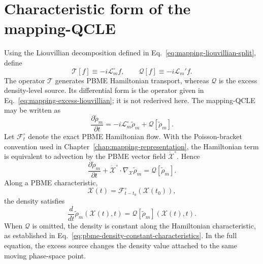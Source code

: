 \documentclass[
  11pt,
  letterpaper,
  onehalfspacing,
  normalmargins,
  equalmargins,
  oneside
]{ut-thesis}
\begin{document}
\section{Characteristic form of the mapping-QCLE}
\label{sec:ch5-characteristic-form}

Using the Liouvillian decomposition defined in
Eq.~\eqref{eq:mapping-liouvillian-split}, define
\begin{equation}
\mathcal T[f]
\equiv
-i\mathcal L_m^{\circ}f,
\qquad
\mathcal Q[f]
\equiv
-i\mathcal L_m'f.
\label{eq:ch5-transport-source-operators}
\end{equation}
The operator \(\mathcal T\) generates PBME Hamiltonian transport, whereas
\(\mathcal Q\) is the excess density-level source. Its differential form is
the operator given in Eq.~\eqref{eq:mapping-excess-liouvillian}; it is not
rederived here.
The mapping-QCLE may be written as
\begin{equation}
\frac{\partial\tilde\rho_m}{\partial t}
=
-i\mathcal L_m^{\circ}\tilde\rho_m
+
\mathcal Q[\tilde\rho_m].
\label{eq:ch5-qcle-source-form}
\end{equation}
Let \(\mathcal F_t^{\circ}\) denote the exact PBME Hamiltonian flow. With the
Poisson-bracket convention used in Chapter~\ref{chap:mapping-representation},
the Hamiltonian term is equivalent to advection by the PBME vector field
\(\dot{\boldsymbol{\mathcal X}}^{\circ}\). Hence
\begin{equation}
\frac{\partial\tilde\rho_m}{\partial t}
+
\dot{\boldsymbol{\mathcal X}}^{\circ}\!\cdot
\nabla_{\boldsymbol{\mathcal X}}\tilde\rho_m
=
\mathcal Q[\tilde\rho_m].
\label{eq:ch5-characteristic-pde}
\end{equation}
Along a PBME characteristic,
\begin{equation}
\boldsymbol{\mathcal X}(t)
=
\mathcal F_{t-t_0}^{\circ}
\left(\boldsymbol{\mathcal X}(t_0)\right),
\label{eq:ch5-pbme-characteristic}
\end{equation}
the density satisfies
\begin{equation}
\frac{d}{dt}
\tilde\rho_m
\left(\boldsymbol{\mathcal X}(t),t\right)
=
\mathcal Q[\tilde\rho_m]
\left(\boldsymbol{\mathcal X}(t),t\right).
\label{eq:ch5-characteristic-density-ode}
\end{equation}
When \(\mathcal Q\) is omitted, the density is constant along the
Hamiltonian characteristic, as established in
Eq.~\eqref{eq:pbme-density-constant-characteristics}. In the full equation,
the excess source changes the density value attached to the same moving
phase-space point.
\end{document}
